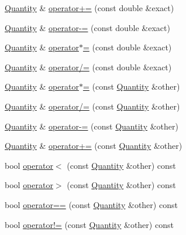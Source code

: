\begin{DoxyCompactItemize}
\item 
\hyperlink{class_wire_cell_1_1_quantity}{Quantity} \& \hyperlink{class_wire_cell_1_1_quantity_a4b85966e763f3981267103c4f60bd836}{operator+=} (const double \&exact)
\item 
\hyperlink{class_wire_cell_1_1_quantity}{Quantity} \& \hyperlink{class_wire_cell_1_1_quantity_acd354b2f1b322acf0d338ac4f9185239}{operator-\/=} (const double \&exact)
\item 
\hyperlink{class_wire_cell_1_1_quantity}{Quantity} \& \hyperlink{class_wire_cell_1_1_quantity_aded6da84658f13dcbffd9906bd86af8f}{operator$\ast$=} (const double \&exact)
\item 
\hyperlink{class_wire_cell_1_1_quantity}{Quantity} \& \hyperlink{class_wire_cell_1_1_quantity_ade18f30c0a2554d567f6c9ae07fc4e74}{operator/=} (const double \&exact)
\item 
\hyperlink{class_wire_cell_1_1_quantity}{Quantity} \& \hyperlink{class_wire_cell_1_1_quantity_ad2fea0539b7dc40f3d6264baf63059d5}{operator$\ast$=} (const \hyperlink{class_wire_cell_1_1_quantity}{Quantity} \&other)
\item 
\hyperlink{class_wire_cell_1_1_quantity}{Quantity} \& \hyperlink{class_wire_cell_1_1_quantity_a1aea96e52f639a40217983f77492e105}{operator/=} (const \hyperlink{class_wire_cell_1_1_quantity}{Quantity} \&other)
\item 
\hyperlink{class_wire_cell_1_1_quantity}{Quantity} \& \hyperlink{class_wire_cell_1_1_quantity_abcb48a4701de9b80bbfa4509639f306d}{operator-\/=} (const \hyperlink{class_wire_cell_1_1_quantity}{Quantity} \&other)
\item 
\hyperlink{class_wire_cell_1_1_quantity}{Quantity} \& \hyperlink{class_wire_cell_1_1_quantity_af74f26160ad96854498529767e9453e6}{operator+=} (const \hyperlink{class_wire_cell_1_1_quantity}{Quantity} \&other)
\item 
bool \hyperlink{class_wire_cell_1_1_quantity_ac8f33a267d1a7f1af9283bdc18e23c8d}{operator$<$} (const \hyperlink{class_wire_cell_1_1_quantity}{Quantity} \&other) const
\item 
bool \hyperlink{class_wire_cell_1_1_quantity_a9b0b6526e30994779e66e602d27ceb28}{operator$>$} (const \hyperlink{class_wire_cell_1_1_quantity}{Quantity} \&other) const
\item 
bool \hyperlink{class_wire_cell_1_1_quantity_a9d01b13091aac93b2cd94ec407ed7eca}{operator==} (const \hyperlink{class_wire_cell_1_1_quantity}{Quantity} \&other) const
\item 
bool \hyperlink{class_wire_cell_1_1_quantity_a730b08268aeacd7587795dfc449ba61b}{operator!=} (const \hyperlink{class_wire_cell_1_1_quantity}{Quantity} \&other) const
\end{DoxyCompactItemize}


